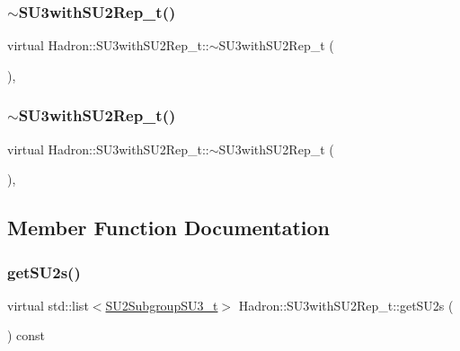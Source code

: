 \subsubsection{\texorpdfstring{$\sim$SU3withSU2Rep\_t()}{~SU3withSU2Rep\_t()}\hspace{0.1cm}{\footnotesize\ttfamily [1/2]}}
{\footnotesize\ttfamily virtual Hadron\+::\+S\+U3with\+S\+U2\+Rep\+\_\+t\+::$\sim$\+S\+U3with\+S\+U2\+Rep\+\_\+t (\begin{DoxyParamCaption}{ }\end{DoxyParamCaption})\hspace{0.3cm}{\ttfamily [inline]}, {\ttfamily [virtual]}}

\mbox{\label{structHadron_1_1SU3withSU2Rep__t_a17a2aadc694cdd6b0c65b63704b89d4b}} 
\subsubsection{\texorpdfstring{$\sim$SU3withSU2Rep\_t()}{~SU3withSU2Rep\_t()}\hspace{0.1cm}{\footnotesize\ttfamily [2/2]}}
{\footnotesize\ttfamily virtual Hadron\+::\+S\+U3with\+S\+U2\+Rep\+\_\+t\+::$\sim$\+S\+U3with\+S\+U2\+Rep\+\_\+t (\begin{DoxyParamCaption}{ }\end{DoxyParamCaption})\hspace{0.3cm}{\ttfamily [inline]}, {\ttfamily [virtual]}}



\subsection{Member Function Documentation}
\mbox{\label{structHadron_1_1SU3withSU2Rep__t_a6bebd41fd203e3340441c04ccc220899}} 
\subsubsection{\texorpdfstring{getSU2s()}{getSU2s()}\hspace{0.1cm}{\footnotesize\ttfamily [1/2]}}
{\footnotesize\ttfamily virtual std\+::list$<$\mbox{\hyperlink{structHadron_1_1SU2SubgroupSU3__t}{S\+U2\+Subgroup\+S\+U3\+\_\+t}}$>$ Hadron\+::\+S\+U3with\+S\+U2\+Rep\+\_\+t\+::get\+S\+U2s (\begin{DoxyParamCaption}{ }\end{DoxyParamCaption}) const\hspace{0.3cm}{\ttfamily [pure virtual]}}

